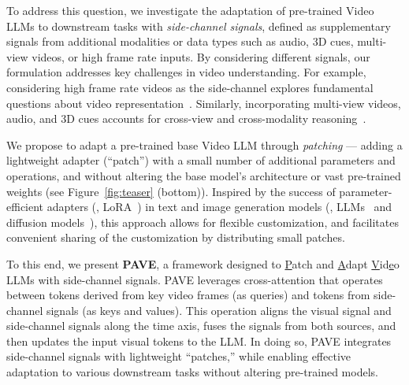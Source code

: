 To address this question, we investigate the adaptation of pre-trained Video LLMs to downstream tasks with \textit{side-channel signals}, defined as supplementary signals from additional modalities or data types such as audio, 3D cues, multi-view videos, or high frame rate inputs. 
By considering different signals, our formulation addresses key challenges in video understanding. 
For example, considering high frame rate videos as the side-channel explores fundamental questions about video representation~\cite{feichtenhofer2019slowfastnetworksvideorecognition}. Similarly, incorporating multi-view videos, audio, and 3D cues accounts for cross-view and cross-modality reasoning~\cite{grauman2024ego, alamri2019audiovisualsceneawaredialog}.




We propose to adapt a pre-trained base Video LLM through \textit{patching} --- adding a lightweight adapter (``patch'') with a small number of additional parameters and operations, and without altering the base model's architecture or vast pre-trained weights (see Figure~\ref{fig:teaser} (bottom)). Inspired by the success of parameter-efficient adapters (\eg, LoRA~\cite{hu2021loralowrankadaptationlarge}) in text and image generation models (\eg, LLMs~\cite{llama3_2, vicuna2023} and diffusion models~\cite{rombach2022highresolutionimagesynthesislatent, polyak2024moviegencastmedia}), this approach allows for flexible customization, and facilitates convenient sharing of the customization by distributing small patches.

To this end, we present \textbf{PAVE}, a framework designed to \underline{P}atch and \underline{A}dapt \underline{V}id\underline{e}o LLMs with side-channel signals. PAVE leverages cross-attention that operates between tokens derived from key video frames (as queries) and tokens from side-channel signals (as keys and values). This operation aligns the visual signal and side-channel signals along the time axis, fuses the signals from both sources, and then updates the input visual tokens to the LLM. In doing so, PAVE integrates side-channel signals with lightweight ``patches,'' while enabling effective adaptation to various downstream tasks without altering pre-trained models. 


